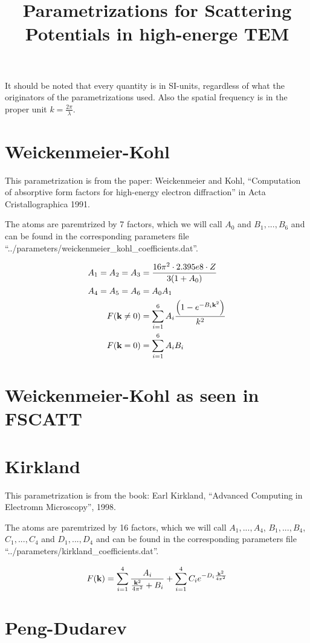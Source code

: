\documentclass{scrartcl}
\title{Parametrizations for Scattering Potentials in high-energe TEM}
\date{}
\begin{document}
\maketitle

\def\vk{{\bf k}}

It should be noted that every quantity is in SI-units, regardless of what the originators of the parametrizations used. Also the spatial frequency is in the proper unit \(k = \frac{2 \pi}{\lambda}\).

\section{Weickenmeier-Kohl}

This parametrization is from the paper: Weickenmeier and Kohl, ``Computation of absorptive form factors for high-energy electron diffraction'' in Acta Cristallographica 1991.

The atoms are paremtrized by 7 factors, which we will call \(A_0\) and \(B_1, ..., B_6\) and can be found in the corresponding parameters file ``../parameters/weickenmeier\_kohl\_coefficients.dat''.

\begin{align}
  A_1 = A_2 = A_3 &= \frac{16 \pi^2 \cdot 2.395e8 \cdot Z}{3(1+A_0)}\\
  A_4 = A_5 = A_6 &= A_0 A_1\\
  F(\vk \neq 0) &= \sum\limits_{i=1}^{6} A_i \frac{\left(1-e^{-B_i \vk^2}\right)}{k^2}\\
  F(\vk = 0) &= \sum\limits_{i=1}^{6} A_i B_i
\end{align}

\section{Weickenmeier-Kohl as seen in FSCATT}

\section{Kirkland}

This parametrization is from the book: Earl Kirkland, ``Advanced Computing in Electromn Microscopy'', 1998.


The atoms are paremtrized by 16 factors, which we will call \(A_1, ..., A_4\), \(B_1, ..., B_4\), \(C_1, ..., C_4\) and \(D_1, ..., D_4\) and can be found in the corresponding parameters file ``../parameters/kirkland\_coefficients.dat''.

\begin{align}
  F(\vk) &= \sum\limits_{i=1}^{4} \frac{A_i}{\frac{\vk^2}{4 \pi^2}+B_i} + \sum\limits_{i=1}^{4} C_i e^{-D_i \frac{\vk^2}{4 \pi^2}} \\
\end{align}

\section{Peng-Dudarev}
\end{document}
